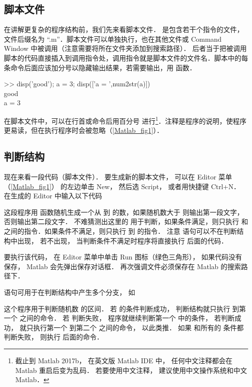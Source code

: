 

\subsection{脚本文件}
在讲解更复杂的程序结构前，我们先来看脚本文件． 是包含若干个指令的文件，文件后缀名为 “.m”．脚本文件可以单独执行，也在其他文件或 Command Window 中被调用（注意需要将所在文件夹添加到搜索路径）． 后者当于把被调用脚本的代码直接插入到调用指令处，调用指令就是脚本文件的文件名．脚本中的每条命令后面应该加分号以隐藏输出结果，若需要输出，用  函数．
\begin{Command}
>> disp({\color{string}'good'}); a = 3; disp([{\color{string}'a = '},num2str(a)]) \\
good \\
a = 3
\end{Command}
在脚本文件中，可以在行首或命令后用百分号 \x{\%} 进行\footnote{截止到 Matlab 2017b， 在英文版 Matlab IDE 中， 任何中文注释都会在 Matlab 重启后变为乱码． 若要使用中文注释， 建议使用中文操作系统和中文 Matlab．}．注释是程序的说明，使程序更易读，但在执行程序时会被忽略（\autoref{Matlab_fig1}）．

\subsection{判断结构}
现在来看一段代码（脚本文件）． 要生成新的脚本文件， 可以在 Editor 菜单（\autoref{Matlab_fig1}） 的左边单击 New， 然后选 Script， 或者用快捷键 Ctrl+N． 在生成的 Editor 中输入以下代码


这段程序用  函数随机生成一个从  到  的数，如果随机数大于  则输出第一段文字，否则输出第二段文字． 不难猜测出这里的  用于判断，如果条件满足，则只执行  和  之间的指令．如果条件不满足，则只执行  到  的指令． 注意  语句可以不在判断结构中出现， 若不出现， 当判断条件不满足时程序将直接执行  后面的代码．

要执行该代码， 在 Editor 菜单中单击 Run 图标（绿色三角形）， 如果代码没有保存， Matlab 会先弹出保存对话框． 再次强调文件必须保存在 Matlab 的搜索路径下．

 语句可用于在判断结构中产生多个分支， 如


这个程序用于判断随机数  的区间． 若  的条件判断成功， 判断结构就只执行  到第一个  之间的命令． 若  判断失败， 程序就继续判断第一个  中的条件， 若判断成功， 就只执行第一个  到第二个  之间的命令， 以此类推． 如果  和所有的  条件都判断失败， 则执行  后面的命令．


